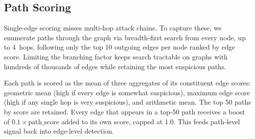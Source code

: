 
\subsection{Path Scoring}
\label{sec:path_scoring}

Single-edge scoring misses multi-hop attack chains. To capture these, we enumerate paths through the graph via breadth-first search from every node, up to 4~hops, following only the top 10 outgoing edges per node ranked by edge score. Limiting the branching factor keeps search tractable on graphs with hundreds of thousands of edges while retaining the most suspicious paths.

Each path is scored as the mean of three aggregates of its constituent edge scores: geometric mean (high if every edge is somewhat suspicious), maximum edge score (high if any single hop is very suspicious), and arithmetic mean. The top 50 paths by score are retained. Every edge that appears in a top-50 path receives a boost of $0.1 \times \text{path\_score}$ added to its own score, capped at 1.0. This feeds path-level signal back into edge-level detection.
